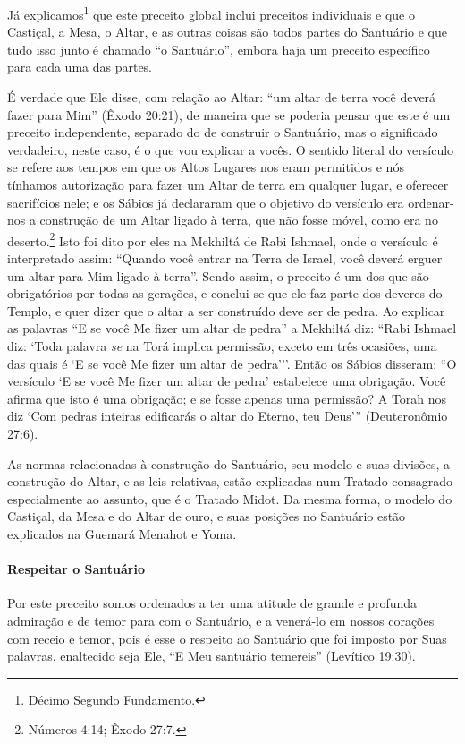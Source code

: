 Já explicamos\footnote{Décimo Segundo Fundamento.} que este preceito global inclui
preceitos individuais e que o Castiçal, a Mesa, o Altar, e as outras coisas são todos partes do Santuário e que tudo isso junto é chamado ``o Santuário'', embora
haja um preceito específico para cada uma das partes.

É verdade que Ele disse, com relação ao Altar: ``um altar de terra você
deverá fazer para Mim'' (Êxodo 20:21), de maneira que se poderia pensar
que este é um preceito independente, separado do de construir o
Santuário, mas o significado verdadeiro, neste caso, é o que vou
explicar a vocês. O sentido literal do versículo se refere aos tempos
em que os Altos Lugares nos eram permitidos e nós tínhamos autorização
para fazer um Altar de terra em qualquer lugar, e oferecer sacrifícios
nele; e os Sábios já declararam que o objetivo do versículo era
ordenar-nos a construção de um Altar ligado à terra, que não fosse
móvel, como era no deserto.\footnote{Números 4:14; Êxodo 27:7.} Isto foi dito por eles
na Mekhiltá de Rabi Ishmael, onde o versículo é interpretado assim:
``Quando você entrar na Terra de Israel, você deverá erguer um altar
para Mim ligado à terra''. Sendo assim, o preceito é um dos que são
obrigatórios por todas as gerações, e conclui-se que ele faz parte dos
deveres do Templo, e quer dizer que o altar a ser construído deve ser
de pedra. Ao explicar as palavras ``E se você Me fizer um altar de
pedra'' a Mekhiltá diz: ``Rabi Ishmael diz: `Toda palavra \emph{se} na
Torá implica permissão, exceto em três ocasiões, uma das quais é `E se
você Me fizer um altar de pedra'''. Então os Sábios disseram: ``O
versículo `E se você Me fizer um altar de pedra' estabelece uma
obrigação. Você afirma que isto é uma obrigação; e se fosse apenas uma
permissão? A Torah nos diz `Com pedras inteiras edificarás o altar do
Eterno, teu Deus''' (Deuteronômio 27:6).

As normas relacionadas à construção do Santuário, seu modelo e suas
divisões, a construção do Altar, e as leis relativas, estão explicadas
num Tratado consagrado especialmente ao assunto, que é o Tratado Midot.
Da mesma forma, o modelo do Castiçal, da Mesa e do Altar de ouro, e suas
posições no Santuário estão explicados na Guemará Menahot e Yoma.

\paragraph{Respeitar o Santuário}

Por este preceito somos ordenados a ter uma atitude de grande e profunda
admiração e de temor para com o Santuário, e a venerá-lo em nossos
corações com receio e temor, pois é esse o respeito ao Santuário que foi
imposto por Suas palavras, enaltecido seja Ele, ``E Meu santuário
temereis'' (Levítico 19:30).

